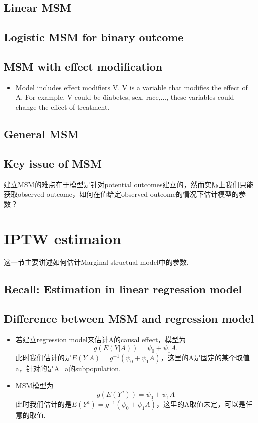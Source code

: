 \subsection{Linear MSM}
\subsection{Logistic MSM for binary outcome}
\subsection{MSM with effect modification}
\begin{itemize}
	\item Model includes effect modifiers V. V is a variable that modifies the effect of A. For example, V could be \r{diabetes, sex, race,...}, these variables could change the effect of treatment. 
\end{itemize}

\subsection{General MSM}
\subsection{Key issue of MSM}
建立MSM的难点在于模型是针对potential outcomes建立的，然而实际上我们只能获取observed outcome，如何在值给定observed outcome的情况下估计模型的参数？


\section{IPTW estimaion}
这一节主要讲述如何估计Marginal structual model中的参数.
\subsection{Recall: Estimation in linear regression model}
\subsection{Difference between MSM and regression model}

\begin{itemize}
	\item 若建立regression model来估计A的causal effect，模型为
	\begin{equation}
	g(E(Y|A))=\psi_0+\psi_1 A.
	\end{equation}
	此时我们估计的是$E(Y|A)=g^{-1}(\psi_0+\psi_1 A)$，这里的A是固定的某个取值a，针对的是A=a的subpopulation.
	 
	\item MSM模型为
	\begin{equation}
	g(E(Y^a))=\psi_0+\psi_1 A
	\end{equation}
	此时我们估计的是$E(Y^a)=g^{-1}(\psi_0+\psi_1 A)$，这里的A取值未定，可以是任意的取值.
\end{itemize}

